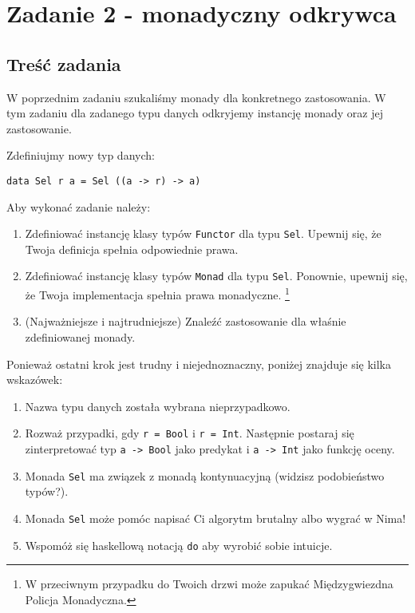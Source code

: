\documentclass{article}[12pt]
\begin{document}
\section{Zadanie 2 - monadyczny odkrywca}
\subsection{Treść zadania}
W poprzednim zadaniu szukaliśmy monady dla konkretnego zastosowania. W tym
zadaniu dla zadanego typu danych odkryjemy instancję monady oraz jej zastosowanie.

Zdefiniujmy nowy typ danych:
\begin{verbatim}
data Sel r a = Sel ((a -> r) -> a)
\end{verbatim}

Aby wykonać zadanie należy:
\begin{enumerate}
    \item Zdefiniować instancję klasy typów \texttt{Functor} dla typu \texttt{Sel}.
        Upewnij się, że Twoja definicja spełnia odpowiednie prawa.
    \item Zdefiniować instancję klasy typów \texttt{Monad} dla typu \texttt{Sel}.
        Ponownie, upewnij się, że Twoja implementacja spełnia prawa monadyczne.
        \footnote{W przeciwnym przypadku do Twoich drzwi może zapukać Międzygwiezdna
        Policja Monadyczna.}
    \item (Najważniejsze i najtrudniejsze) Znaleźć zastosowanie dla właśnie zdefiniowanej
        monady.
\end{enumerate}

Ponieważ ostatni krok jest trudny i niejednoznaczny, poniżej znajduje się kilka
wskazówek:
\begin{enumerate}
    \item Nazwa typu danych została wybrana nieprzypadkowo.
    \item Rozważ przypadki, gdy \texttt{r = Bool} i \texttt{r = Int}. Następnie
        postaraj się zinterpretować typ \texttt{a -> Bool} jako predykat i
        \texttt{a -> Int} jako funkcję oceny.
    \item Monada \texttt{Sel} ma związek z monadą kontynuacyjną (widzisz podobieństwo
        typów?).
    \item Monada \texttt{Sel} może pomóc napisać Ci algorytm brutalny albo wygrać
        w Nima!
    \item Wspomóż się haskellową notacją \texttt{do} aby wyrobić sobie intuicje.
\end{enumerate}
\end{document}
